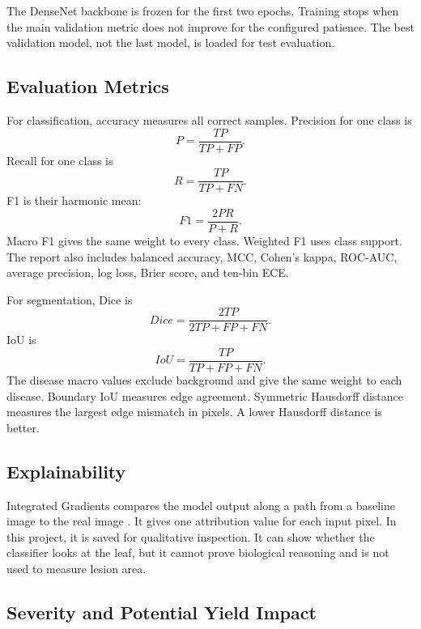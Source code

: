 \documentclass[12pt,a4paper]{article}
\begin{document}
The DenseNet backbone is frozen for the first two epochs. Training stops when the main
validation metric does not improve for the configured patience. The best validation model,
not the last model, is loaded for test evaluation.

\subsection{Evaluation Metrics}
For classification, accuracy measures all correct samples. Precision for one class is
\begin{equation}
P=\frac{TP}{TP+FP}.
\end{equation}
Recall for one class is
\begin{equation}
R=\frac{TP}{TP+FN}.
\end{equation}
F1 is their harmonic mean:
\begin{equation}
F1=\frac{2PR}{P+R}.
\end{equation}
Macro F1 gives the same weight to every class. Weighted F1 uses class support. The report
also includes balanced accuracy, MCC, Cohen's kappa, ROC-AUC, average precision, log
loss, Brier score, and ten-bin ECE.

For segmentation, Dice is
\begin{equation}
Dice=\frac{2TP}{2TP+FP+FN}.
\end{equation}
IoU is
\begin{equation}
IoU=\frac{TP}{TP+FP+FN}.
\end{equation}
The disease macro values exclude background and give the same weight to each disease.
Boundary IoU measures edge agreement. Symmetric Hausdorff distance measures the largest
edge mismatch in pixels. A lower Hausdorff distance is better.

\subsection{Explainability}
Integrated Gradients compares the model output along a path from a baseline image to the
real image \cite{sundararajan2017integrated}. It gives one attribution value for each input
pixel. In this project, it is saved for qualitative inspection. It can show whether the
classifier looks at the leaf, but it cannot prove biological reasoning and is not used to
measure lesion area.

\subsection{Severity and Potential Yield Impact}
\end{document}
